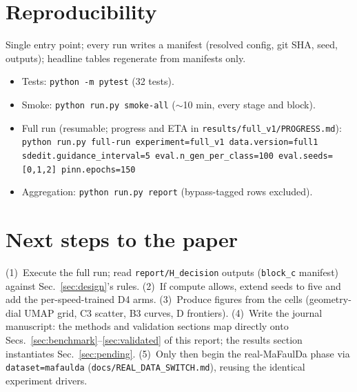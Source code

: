 \documentclass[11pt]{article}
\newcommand{\code}[1]{\texttt{\small #1}}
\begin{document}
\section{Reproducibility}
\label{sec:repro}

Single entry point; every run writes a manifest (resolved config, git SHA,
seed, outputs); headline tables regenerate from manifests only.

\begin{itemize}[leftmargin=1.6em,itemsep=1pt]
\item Tests: \code{python -m pytest} (32 tests).
\item Smoke: \code{python run.py smoke-all} ($\sim$10 min, every stage and block).
\item Full run (resumable; progress and ETA in
\code{results/full\_v1/PROGRESS.md}):\\[2pt]
\code{python run.py full-run experiment=full\_v1 data.version=full1
sdedit.guidance\_interval=5 eval.n\_gen\_per\_class=100 eval.seeds=[0,1,2]
pinn.epochs=150}
\item Aggregation: \code{python run.py report} (bypass-tagged rows excluded).
\end{itemize}

\section{Next steps to the paper}
\label{sec:next}

(1)~Execute the full run; read \code{report/H\_decision} outputs
(\code{block\_c} manifest) against Sec.~\ref{sec:design}'s rules.
(2)~If compute allows, extend seeds to five and add the per-speed-trained D4
arms. (3)~Produce figures from the cells (geometry-dial UMAP grid, C3
scatter, B3 curves, D frontiers). (4)~Write the journal manuscript: the
methods and validation sections map directly onto
Secs.~\ref{sec:benchmark}--\ref{sec:validated} of this report; the results
section instantiates Sec.~\ref{sec:pending}. (5)~Only then begin the
real-MaFaulDa phase via \code{dataset=mafaulda}
(\code{docs/REAL\_DATA\_SWITCH.md}), reusing the identical experiment
drivers.



\end{document}
